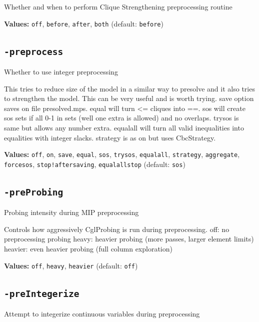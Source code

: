 \documentclass[11pt,a4paper]{article}
\begin{document}
Whether and when to perform Clique Strengthening preprocessing routine

\textbf{Values:} \texttt{off}, \texttt{before}, \texttt{after}, \texttt{both} (default: \texttt{before})

\subsection*{\texttt{-preprocess}}

Whether to use integer preprocessing

This tries to reduce size of the model in a similar way to presolve and it also tries to strengthen the model. This can be very useful and is worth trying.  save option saves on file presolved.mps.  equal will turn <= cliques into ==.  sos will create sos sets if all 0-1 in sets (well one extra is allowed) and no overlaps.  trysos is same but allows any number extra. equalall will turn all valid inequalities into equalities with integer slacks. strategy is as on but uses CbcStrategy.

\textbf{Values:} \texttt{off}, \texttt{on}, \texttt{save}, \texttt{equal}, \texttt{sos}, \texttt{trysos}, \texttt{equalall}, \texttt{strategy}, \texttt{aggregate}, \texttt{forcesos}, \texttt{stop!aftersaving}, \texttt{equalallstop} (default: \texttt{sos})

\subsection*{\texttt{-preProbing}}

Probing intensity during MIP preprocessing

Controls how aggressively CglProbing is run during preprocessing.
  off: no preprocessing probing
  heavy: heavier probing (more passes, larger element limits)
  heavier: even heavier probing (full column exploration)

\textbf{Values:} \texttt{off}, \texttt{heavy}, \texttt{heavier} (default: \texttt{off})

\subsection*{\texttt{-preIntegerize}}

Attempt to integerize continuous variables during preprocessing
\end{document}

